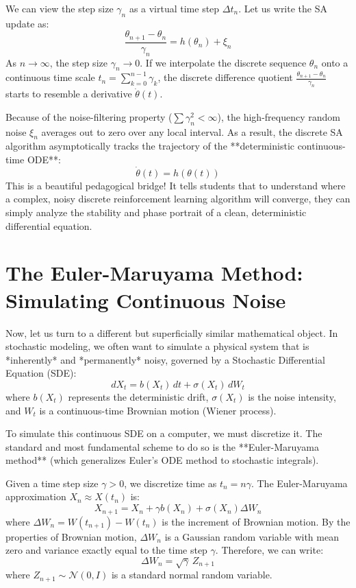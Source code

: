 \documentclass[11pt]{article}
\begin{document}
We can view the step size $\gamma_n$ as a virtual time step $\Delta t_n$. Let us write the SA update as:
\begin{equation}
    \frac{\theta_{n+1} - \theta_n}{\gamma_n} = h(\theta_n) + \xi_n
\end{equation}
As $n \to \infty$, the step size $\gamma_n \to 0$. If we interpolate the discrete sequence $\theta_n$ onto a continuous time scale $t_n = \sum_{k=0}^{n-1} \gamma_k$, the discrete difference quotient $\frac{\theta_{n+1} - \theta_n}{\gamma_n}$ starts to resemble a derivative $\dot{\theta}(t)$.

Because of the noise-filtering property ($\sum \gamma_n^2 < \infty$), the high-frequency random noise $\xi_n$ averages out to zero over any local interval. As a result, the discrete SA algorithm asymptotically tracks the trajectory of the **deterministic continuous-time ODE**:
\begin{equation}
    \dot{\theta}(t) = h(\theta(t))
\end{equation}
This is a beautiful pedagogical bridge! It tells students that to understand where a complex, noisy discrete reinforcement learning algorithm will converge, they can simply analyze the stability and phase portrait of a clean, deterministic differential equation.

\section{The Euler-Maruyama Method: Simulating Continuous Noise}

Now, let us turn to a different but superficially similar mathematical object. In stochastic modeling, we often want to simulate a physical system that is *inherently* and *permanently* noisy, governed by a Stochastic Differential Equation (SDE):
\begin{equation}
    dX_t = b(X_t) \, dt + \sigma(X_t) \, dW_t
\end{equation}
where $b(X_t)$ represents the deterministic drift, $\sigma(X_t)$ is the noise intensity, and $W_t$ is a continuous-time Brownian motion (Wiener process).

To simulate this continuous SDE on a computer, we must discretize it. The standard and most fundamental scheme to do so is the **Euler-Maruyama method** (which generalizes Euler's ODE method to stochastic integrals). 

Given a time step size $\gamma > 0$, we discretize time as $t_n = n\gamma$. The Euler-Maruyama approximation $X_n \approx X(t_n)$ is:
\begin{equation}
    X_{n+1} = X_n + \gamma b(X_n) + \sigma(X_n) \Delta W_n
\end{equation}
where $\Delta W_n = W(t_{n+1}) - W(t_n)$ is the increment of Brownian motion. By the properties of Brownian motion, $\Delta W_n$ is a Gaussian random variable with mean zero and variance exactly equal to the time step $\gamma$. Therefore, we can write:
\begin{equation}
    \Delta W_n = \sqrt{\gamma} \, Z_{n+1}
\end{equation}
where $Z_{n+1} \sim \mathcal{N}(0, I)$ is a standard normal random variable. 
\end{document}

